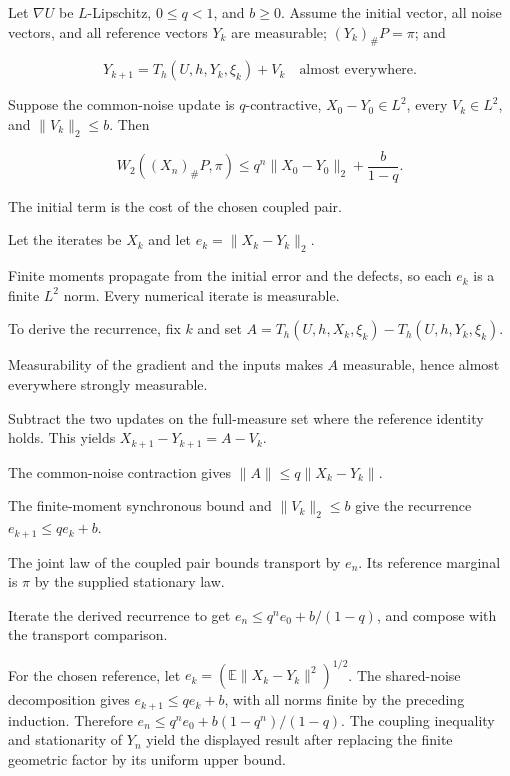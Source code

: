 \documentclass[11pt,a4paper]{report}
\begin{document}
Let \(\nabla U\) be \(L\)-Lipschitz, \(0\le q<1\), and \(b\ge0\). Assume the initial vector, all noise vectors, and all reference vectors \(Y_k\) are measurable; \((Y_k)_\#P=\pi\); and

\[Y_{k+1}=T_h(U,h,Y_k,\xi_k)+V_k\quad\text{almost everywhere}.\]

Suppose the common-noise update is \(q\)-contractive, \(X_0-Y_0\in L^2\), every \(V_k\in L^2\), and \(\|V_k\|_2\le b\). Then

\[W_2((X_n)_\#P,\pi)\le q^n\|X_0-Y_0\|_2+\frac b{1-q}.\]

The initial term is the cost of the chosen coupled pair.



Let the iterates be \(X_k\) and let \(e_k=\|X_k-Y_k\|_2\).



Finite moments propagate from the initial error and the defects, so each \(e_k\) is a finite \(L^2\) norm. Every numerical iterate is measurable.



To derive the recurrence, fix \(k\) and set \(A=T_h(U,h,X_k,\xi_k)-T_h(U,h,Y_k,\xi_k)\).



Measurability of the gradient and the inputs makes \(A\) measurable, hence almost everywhere strongly measurable.



Subtract the two updates on the full-measure set where the reference identity holds. This yields \(X_{k+1}-Y_{k+1}=A-V_k\).



The common-noise contraction gives \(\|A\|\le q\|X_k-Y_k\|\).



The finite-moment synchronous bound and \(\|V_k\|_2\le b\) give the recurrence \(e_{k+1}\le qe_k+b\).



The joint law of the coupled pair bounds transport by \(e_n\). Its reference marginal is \(\pi\) by the supplied stationary law.



Iterate the derived recurrence to get \(e_n\le q^ne_0+b/(1-q)\), and compose with the transport comparison.



For the chosen reference, let \(e_k=(\mathbb E\|X_k-Y_k\|^2)^{1/2}\). The shared-noise decomposition gives \(e_{k+1}\le qe_k+b\), with all norms finite by the preceding induction. Therefore \(e_n\le q^ne_0+b(1-q^n)/(1-q)\). The coupling inequality and stationarity of \(Y_n\) yield the displayed result after replacing the finite geometric factor by its uniform upper bound.
\end{document}
